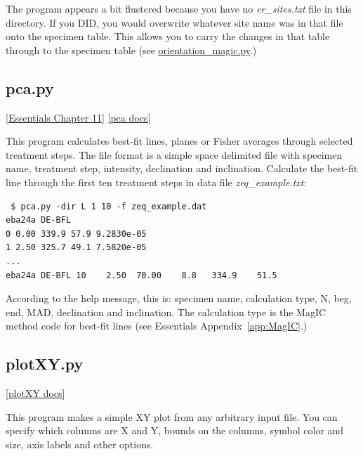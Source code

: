 \documentclass[11pt]{book}
\begin{document}
{{The program appears a bit flustered because you have no {\it er\_sites.txt} file in this directory.  If you DID, you would overwrite whatever site name was in that file onto the specimen table.  This allows you to carry the changes in that table through to the specimen table (see \href{#orientation_magic.py}{orientation\_magic.py}.)


%
\subsection{pca.py}
\href{http://earthref.org/MAGIC/books/Tauxe/Essentials/WebBook3ch11.html#ch11}{[Essentials Chapter 11]}
\href{https://github.com/PmagPy/PmagPy/blob/master/programs/pca.py}{[pca docs]}

This program calculates best-fit lines, planes or Fisher averages through selected treatment steps.  The file format is
a simple space delimited file with specimen name, treatment step,  intensity, declination and inclination.  Calculate the best-fit
line through the first ten treatment steps in data file {\it zeq\_example.txt}:

 \begin{verbatim}
 $ pca.py -dir L 1 10 -f zeq_example.dat
eba24a DE-BFL
0 0.00 339.9 57.9 9.2830e-05
1 2.50 325.7 49.1 7.5820e-05
...
eba24a DE-BFL 10    2.50  70.00    8.8   334.9    51.5
\end{verbatim}

 According to the help message, this is: specimen name, calculation type, N, beg, end, MAD, declination and inclination.   The calculation type is the MagIC method code for best-fit lines (see Essentials Appendix~\ref{app:MagIC}.)


%
%


  \subsection{plotXY.py}
  \href{https://github.com/PmagPy/PmagPy/blob/master/programs/plotXY.py}{[plotXY docs]}

This program makes a simple XY plot from any arbitrary input file.  You can specify which columns are X and Y, bounds on the columns, symbol color and size, axis labels and other options.  

}}
\end{document}
